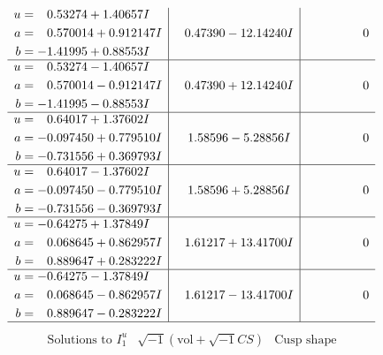 \documentclass[1p]{elsarticle_modified}
\theoremstyle{definition}
\newcommand{\I}{\sqrt{-1}}
\begin{document}
$$\begin{array}{c|c|c}
\begin{aligned}
u &= \phantom{-}0.53274 + 1.40657 I \\
a &= \phantom{-}0.570014 + 0.912147 I \\
b &= -1.41995 + 0.88553 I\end{aligned}
 & \phantom{-}0.47390 - 12.14240 I & \phantom{-0.000000 } 0 \\ \hline\begin{aligned}
u &= \phantom{-}0.53274 - 1.40657 I \\
a &= \phantom{-}0.570014 - 0.912147 I \\
b &= -1.41995 - 0.88553 I\end{aligned}
 & \phantom{-}0.47390 + 12.14240 I & \phantom{-0.000000 } 0 \\ \hline\begin{aligned}
u &= \phantom{-}0.64017 + 1.37602 I \\
a &= -0.097450 + 0.779510 I \\
b &= -0.731556 + 0.369793 I\end{aligned}
 & \phantom{-}1.58596 - 5.28856 I & \phantom{-0.000000 } 0 \\ \hline\begin{aligned}
u &= \phantom{-}0.64017 - 1.37602 I \\
a &= -0.097450 - 0.779510 I \\
b &= -0.731556 - 0.369793 I\end{aligned}
 & \phantom{-}1.58596 + 5.28856 I & \phantom{-0.000000 } 0 \\ \hline\begin{aligned}
u &= -0.64275 + 1.37849 I \\
a &= \phantom{-}0.068645 + 0.862957 I \\
b &= \phantom{-}0.889647 + 0.283222 I\end{aligned}
 & \phantom{-}1.61217 + 13.41700 I & \phantom{-0.000000 } 0 \\ \hline\begin{aligned}
u &= -0.64275 - 1.37849 I \\
a &= \phantom{-}0.068645 - 0.862957 I \\
b &= \phantom{-}0.889647 - 0.283222 I\end{aligned}
 & \phantom{-}1.61217 - 13.41700 I & \phantom{-0.000000 } 0\\
 \hline 
 \end{array}$$\newpage$$\begin{array}{c|c|c}  
\text{Solutions to }I^u_{1}& \I (\text{vol} + \sqrt{-1}CS) & \text{Cusp shape}\\

\end{array}$$
\end{document}
